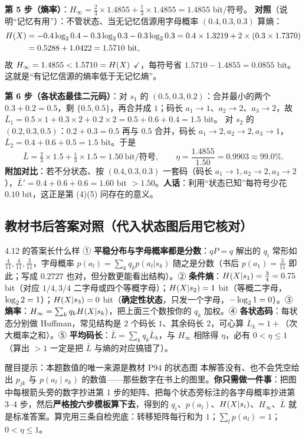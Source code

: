 \documentclass[11pt,a4paper]{ctexart}
\begin{document}
\textbf{第 5 步（熵率）}：$H_\infty=\frac23\times1.4855+\frac13\times1.4855=1.4855$ bit/符号。
\textbf{对照}（说明“记忆有用”）：不管状态、当无记忆信源用字母概率 $(0.4,0.3,0.3)$ 算熵：
\begin{align*}
H\!\left(X\right)&=-0.4\log_{2}0.4-0.3\log_{2}0.3-0.3\log_{2}0.3=0.4\times1.3219+2\times(0.3\times1.7370)\notag\\
&=0.5288+1.0422=1.5710\ \text{bit},
\end{align*}
故 $H_\infty=1.4855<1.5710=H\!\left(X\right)$ $\checkmark$，每符号省 $1.5710-1.4855=0.0855$ bit。这就是“有记忆信源的熵率低于无记忆熵”。

\textbf{第 6 步（各状态最佳二元码）}：对 $s_1$ 的 $(0.5,0.3,0.2)$：合并最小的两个 $0.3+0.2=0.5$，剩 $\{0.5,0.5\}$，再合并成 $1$；码长 $a_1\to1$、$a_2\to2$、$a_3\to2$，故 $\bar L_1=0.5\times1+0.3\times2+0.2\times2=0.5+0.6+0.4=1.5$ bit。
对 $s_2$ 的 $(0.2,0.3,0.5)$：$0.2+0.3=0.5$ 再与 $0.5$ 合并，码长 $a_1\to2,a_2\to2,a_3\to1$，$\bar L_2=0.4+0.6+0.5=1.5$ bit。于是
\[
\bar L=\tfrac23\times1.5+\tfrac13\times1.5=1.50\ \text{bit/符号},\qquad
\eta=\frac{1.4855}{1.50}=0.9903\approx99.0\% .
\]
\textbf{附加对比}：若不分状态、按 $(0.4,0.3,0.3)$ 一套码（码长 $a_1\to1,a_2\to2,a_3\to2$），$\bar L'=0.4+0.6+0.6=1.60$ bit $>1.50$。\textbf{人话}：利用“状态已知”每符号少花 $0.10$ bit，这正是第 (4)(5) 问存在的意义。

\subsection{教材书后答案对照（代入状态图后用它核对）}
\begin{idea}{4.12 的答案长什么样}
① \textbf{平稳分布与字母概率都是分数}：$qP=q$ 解出的 $q_i$ 常形如 $\frac4{11},\frac4{11},\frac3{11}$，字母概率 $p(a_l)=\sum_kq_kp(a_l|s_k)$ 随之是分数（书后 $p(a_1)=\frac3{11}$ 即此；写成 $0.2727$ 也对，但分数更能看出结构）。② \textbf{条件熵}：$H\!\left(X|s_1\right)=\frac34=0.75$ bit（对应 $1/4,3/4$ 二字母或四个等概字母）；$H\!\left(X|s_2\right)=1$ bit（等概二字母，$\log_{2}2=1$）；$H\!\left(X|s_3\right)=0$ bit（\textbf{确定性状态}，只发一个字母，$-\log_{2}1=0$）。③ \textbf{熵率}：$H_\infty=\sum_kq_kH\!\left(X|s_k\right)$，把上面三个数按你的 $q_k$ 加权。④ \textbf{各状态码}：每状态分别做 Huffman，常见结构是 $2$ 个码长 $1$、其余码长 $2$，可心算 $\bar L_k=1+$（次大概率之和）。⑤ \textbf{平均码长}：$\bar L=\sum_kq_k\bar L_k$，与 $H_\infty$ 相除得 $\eta$，必有 $0<\eta\le1$（算出 $>1$ 一定是把 $\bar L$ 与熵的对应搞错了）。
\end{idea}

\begin{qa}{醒目提示：本题数值的唯一来源是教材 P94 的状态图}
本解答没有、也不会凭空给出 $p_{jk}$ 与 $p(a_l\mid s_k)$ 的数值——那些数字在书上的图里。\textbf{你只需做一件事}：把图中每根箭头旁的数字抄进第 1 步的矩阵、把每个状态旁标注的各字母概率抄进第 3--4 步，然后\textbf{严格按六步模板算下去}，得到的 $q_i$、$p(a_l)$、$H\!\left(X|s_i\right)$、$H_\infty$、$\bar L$ 就是标准答案。算完用三条自检兜底：转移矩阵每行和为 $1$；$\sum_l p(a_l)=1$；$0<\eta\le1$。
\end{qa}
\end{document}

